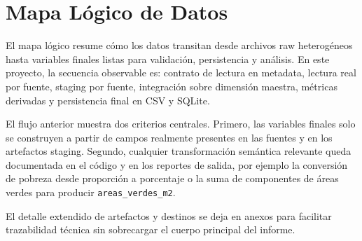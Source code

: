 \chapter{Mapa Lógico de Datos}

El mapa lógico resume cómo los datos transitan desde archivos raw heterogéneos hasta variables finales listas para validación, persistencia y análisis. En este proyecto, la secuencia observable es: contrato de lectura en metadata, lectura real por fuente, staging por fuente, integración sobre dimensión maestra, métricas derivadas y persistencia final en CSV y SQLite.



El flujo anterior muestra dos criterios centrales. Primero, las variables finales solo se construyen a partir de campos realmente presentes en las fuentes y en los artefactos staging. Segundo, cualquier transformación semántica relevante queda documentada en el código y en los reportes de salida, por ejemplo la conversión de pobreza desde proporción a porcentaje o la suma de componentes de áreas verdes para producir \texttt{areas\_verdes\_m2}.

El detalle extendido de artefactos y destinos se deja en anexos para facilitar trazabilidad técnica sin sobrecargar el cuerpo principal del informe.
